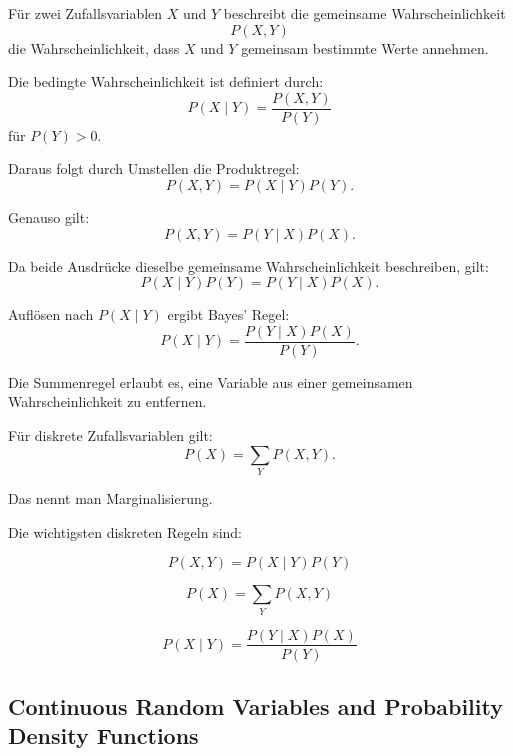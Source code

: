\documentclass[11pt,a4paper]{scrartcl}
\begin{document}
\begin{calculationbox}
    Für zwei Zufallsvariablen \(X\) und \(Y\) beschreibt die gemeinsame
    Wahrscheinlichkeit
    \[
        P(X,Y)
    \]
    die Wahrscheinlichkeit, dass \(X\) und \(Y\) gemeinsam bestimmte Werte
    annehmen.

    Die bedingte Wahrscheinlichkeit ist definiert durch:
    \[
        P(X \mid Y)
        =
        \frac{P(X,Y)}{P(Y)}
    \]
    für \(P(Y)>0\).

    Daraus folgt durch Umstellen die Produktregel:
    \[
        P(X,Y)
        =
        P(X \mid Y)P(Y).
    \]

    Genauso gilt:
    \[
        P(X,Y)
        =
        P(Y \mid X)P(X).
    \]
\end{calculationbox}

\begin{calculationbox}
    Da beide Ausdrücke dieselbe gemeinsame Wahrscheinlichkeit beschreiben,
    gilt:
    \[
        P(X \mid Y)P(Y)
        =
        P(Y \mid X)P(X).
    \]

    Auflösen nach \(P(X \mid Y)\) ergibt Bayes' Regel:
    \[
        P(X \mid Y)
        =
        \frac{P(Y \mid X)P(X)}{P(Y)}.
    \]
\end{calculationbox}

\begin{calculationbox}
    Die Summenregel erlaubt es, eine Variable aus einer gemeinsamen
    Wahrscheinlichkeit zu entfernen.

    Für diskrete Zufallsvariablen gilt:
    \[
        P(X)
        =
        \sum_Y P(X,Y).
    \]

    Das nennt man Marginalisierung.
\end{calculationbox}

\begin{answerbox}
    Die wichtigsten diskreten Regeln sind:

    \[
        \boxed{
            P(X,Y)
            =
            P(X \mid Y)P(Y)
        }
    \]

    \[
        \boxed{
            P(X)
            =
            \sum_Y P(X,Y)
        }
    \]

    \[
        \boxed{
            P(X \mid Y)
            =
            \frac{P(Y \mid X)P(X)}{P(Y)}
        }
    \]
\end{answerbox}

\subsection{Continuous Random Variables and Probability Density Functions}
\end{document}
